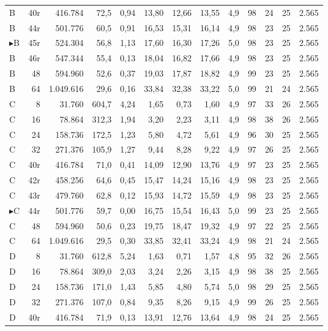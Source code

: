 {\begin{longtable}{l r r r r r r r r r r r r}
B & 40r & 416.784 & 72,5 & 0,94 & 13,80 & 12,66 & 13,55 & 4,9 & 98 & 24 & 25 & 2.565 \\
B & 44r & 501.776 & 60,5 & 0,91 & 16,53 & 15,31 & 16,14 & 4,9 & 98 & 23 & 25 & 2.565 \\
$\blacktriangleright$B & 45r & 524.304 & 56,8 & 1,13 & 17,60 & 16,30 & 17,26 & 5,0 & 98 & 23 & 25 & 2.565 \\
B & 46r & 547.344 & 55,4 & 0,13 & 18,04 & 16,82 & 17,66 & 4,9 & 98 & 23 & 25 & 2.565 \\
B & 48 & 594.960 & 52,6 & 0,37 & 19,03 & 17,87 & 18,82 & 4,9 & 99 & 23 & 25 & 2.565 \\
B & 64 & 1.049.616 & 29,6 & 0,16 & 33,84 & 32,38 & 33,22 & 5,0 & 99 & 21 & 24 & 2.565 \\
\midrule
C & 8 & 31.760 & 604,7 & 4,24 & 1,65 & 0,73 & 1,60 & 4,9 & 97 & 33 & 26 & 2.565 \\
C & 16 & 78.864 & 312,3 & 1,94 & 3,20 & 2,23 & 3,11 & 4,9 & 98 & 38 & 26 & 2.565 \\
C & 24 & 158.736 & 172,5 & 1,23 & 5,80 & 4,72 & 5,61 & 4,9 & 96 & 30 & 25 & 2.565 \\
C & 32 & 271.376 & 105,9 & 1,27 & 9,44 & 8,28 & 9,22 & 4,9 & 97 & 26 & 25 & 2.565 \\
C & 40r & 416.784 & 71,0 & 0,41 & 14,09 & 12,90 & 13,76 & 4,9 & 97 & 23 & 25 & 2.565 \\
C & 42r & 458.256 & 64,6 & 0,45 & 15,47 & 14,24 & 15,16 & 4,9 & 98 & 23 & 25 & 2.565 \\
C & 43r & 479.760 & 62,8 & 0,12 & 15,93 & 14,72 & 15,59 & 4,9 & 98 & 23 & 25 & 2.565 \\
$\blacktriangleright$C & 44r & 501.776 & 59,7 & 0,00 & 16,75 & 15,54 & 16,43 & 5,0 & 99 & 23 & 25 & 2.565 \\
C & 48 & 594.960 & 50,6 & 0,23 & 19,75 & 18,47 & 19,32 & 4,9 & 97 & 22 & 25 & 2.565 \\
C & 64 & 1.049.616 & 29,5 & 0,30 & 33,85 & 32,41 & 33,24 & 4,9 & 98 & 21 & 24 & 2.565 \\
\midrule
D & 8 & 31.760 & 612,8 & 5,24 & 1,63 & 0,71 & 1,57 & 4,8 & 95 & 32 & 26 & 2.565 \\
D & 16 & 78.864 & 309,0 & 2,03 & 3,24 & 2,26 & 3,15 & 4,9 & 98 & 38 & 25 & 2.565 \\
D & 24 & 158.736 & 171,0 & 1,43 & 5,85 & 4,80 & 5,74 & 5,0 & 98 & 29 & 25 & 2.565 \\
D & 32 & 271.376 & 107,0 & 0,84 & 9,35 & 8,26 & 9,15 & 4,9 & 99 & 26 & 25 & 2.565 \\
D & 40r & 416.784 & 71,9 & 0,13 & 13,91 & 12,76 & 13,64 & 4,9 & 98 & 24 & 25 & 2.565 \\

\end{longtable}}
